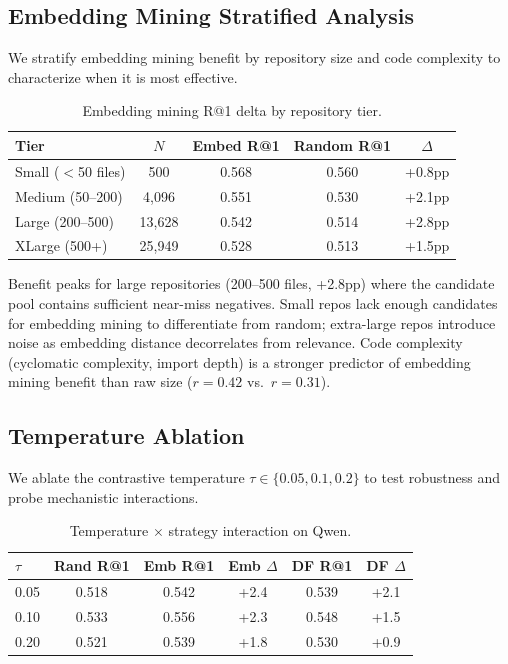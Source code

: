 \documentclass[11pt,a4paper]{article}
\begin{document}
\subsection{Embedding Mining Stratified Analysis}

We stratify embedding mining benefit by repository size and code complexity to characterize when it is most effective.

\begin{table}[t]
\centering
\small
\caption{Embedding mining R@1 delta by repository tier.}
\label{tab:stratified}
\begin{tabular}{lcccc}
\toprule
\textbf{Tier} & \textbf{$N$} & \textbf{Embed R@1} & \textbf{Random R@1} & \textbf{$\Delta$} \\
\midrule
Small ($<$50 files) & 500 & 0.568 & 0.560 & +0.8pp \\
Medium (50--200) & 4,096 & 0.551 & 0.530 & +2.1pp \\
Large (200--500) & 13,628 & 0.542 & 0.514 & +2.8pp \\
XLarge (500+) & 25,949 & 0.528 & 0.513 & +1.5pp \\
\bottomrule
\end{tabular}
\end{table}

Benefit peaks for large repositories (200--500 files, +2.8pp) where the candidate pool contains sufficient near-miss negatives. Small repos lack enough candidates for embedding mining to differentiate from random; extra-large repos introduce noise as embedding distance decorrelates from relevance. Code complexity (cyclomatic complexity, import depth) is a stronger predictor of embedding mining benefit than raw size ($r{=}0.42$ vs.\ $r{=}0.31$).

\subsection{Temperature Ablation}
\label{sec:temp}

We ablate the contrastive temperature $\tau \in \{0.05, 0.1, 0.2\}$ to test robustness and probe mechanistic interactions.

\begin{table}[t]
\centering
\small
\caption{Temperature $\times$ strategy interaction on Qwen.}
\label{tab:temperature}
\begin{tabular}{lccccc}
\toprule
\textbf{$\tau$} & \textbf{Rand R@1} & \textbf{Emb R@1} & \textbf{Emb $\Delta$} & \textbf{DF R@1} & \textbf{DF $\Delta$} \\
\midrule
0.05 & 0.518 & 0.542 & +2.4 & 0.539 & +2.1 \\
0.10 & 0.533 & 0.556 & +2.3 & 0.548 & +1.5 \\
0.20 & 0.521 & 0.539 & +1.8 & 0.530 & +0.9 \\
\bottomrule
\end{tabular}
\end{table}
\end{document}

